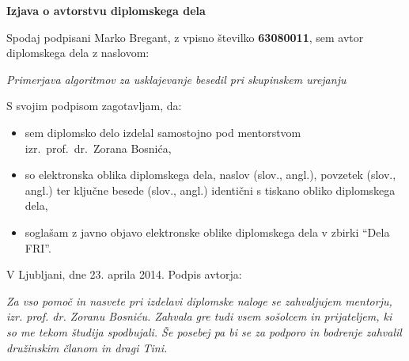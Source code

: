 \documentclass[a4paper, 12pt, twoside]{book}
\newcommand{\clearemptydoublepage}{\newpage{\pagestyle{empty}\cleardoublepage}} %
\begin{document}
\clearemptydoublepage

\thispagestyle{empty}
\vspace*{4cm}
\begin{center} 
	{\Large \textbf{\sc Izjava o avtorstvu diplomskega dela}}
\end{center}

\vspace{1cm}
\noindent Spodaj podpisani Marko Bregant, z vpisno številko \textbf{63080011}, sem avtor di\-plomskega dela z naslovom:

\vspace{0.5cm}
{\large \emph{Primerjava algoritmov za usklajevanje besedil pri skupinskem urejanju}}

\vspace{1.5cm}
\noindent S svojim podpisom zagotavljam, da:
\begin{itemize}
	\item sem diplomsko delo izdelal samostojno pod mentorstvom izr.\ prof.\ dr.\ Zorana Bosnića,
	\item so elektronska oblika diplomskega dela, naslov (slov., angl.), povzetek (slov., angl.) ter ključne besede (slov., angl.) identični s tiskano obliko diplomskega dela,
	\item soglašam z javno objavo elektronske oblike diplomskega dela v zbirki “Dela FRI”.
\end{itemize}

\vspace{1cm}
\noindent V Ljubljani, dne 23. aprila 2014. \hfill Podpis avtorja:

\clearemptydoublepage

\thispagestyle{empty}\mbox{}\vfill\null\it%
Za vso pomoč in nasvete pri izdelavi diplomske naloge se zahvaljujem mentorju, izr. prof. dr. Zoranu Bosniću. Zahvala gre tudi vsem sošolcem in prijateljem, ki so me tekom študija spodbujali. Še posebej pa bi se za podporo in bodrenje zahvalil družinskim članom in dragi Tini. \rm\normalfont

\clearemptydoublepage

\def\thepage{} %
\tableofcontents{}

\end{document}
